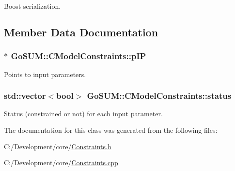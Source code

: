 Boost serialization. 



\subsection{Member Data Documentation}
\hypertarget{class_go_s_u_m_1_1_c_model_constraints_a174e787472c4043054393c0bb5aaf402}{
\subsubsection[{p\-I\-P}]{$\ast$ Go\-S\-U\-M\-::\-C\-Model\-Constraints\-::p\-I\-P\hspace{0.3cm}{\ttfamily [protected]}}}\label{class_go_s_u_m_1_1_c_model_constraints_a174e787472c4043054393c0bb5aaf402}


Points to input parameters. 

\hypertarget{class_go_s_u_m_1_1_c_model_constraints_a499e59d8384b98eaba5498043e792f26}{
\subsubsection[{status}]{\setlength{\rightskip}{0pt plus 5cm}std\-::vector$<$bool$>$ Go\-S\-U\-M\-::\-C\-Model\-Constraints\-::status\hspace{0.3cm}{\ttfamily [protected]}}}\label{class_go_s_u_m_1_1_c_model_constraints_a499e59d8384b98eaba5498043e792f26}
Status (constrained or not) for each input parameter. 

The documentation for this class was generated from the following files\-:\begin{DoxyCompactItemize}
\item 
C\-:/\-Development/core/\hyperlink{_constraints_8h}{Constraints.\-h}\item 
C\-:/\-Development/core/\hyperlink{_constraints_8cpp}{Constraints.\-cpp}\end{DoxyCompactItemize}
